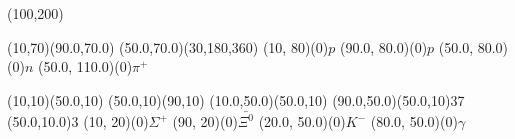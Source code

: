 \documentclass[a4paper]{article}
\begin{document}
        
    \begin{center}
    \begin{axopicture}(100,200) 
    
        \Line[arrow,arrowpos=0.5,arrowlength=6,arrowwidth=3,arrowinset=0.1](10,70)(90.0,70.0)
        (50.0,70.0)(30,180,360)
        \Text(10, 80)(0){$p$}
        \Text(90.0, 80.0)(0){$p$}
        \Text(50.0, 80.0)(0){$n$}
        \Text(50.0, 110.0)(0){$\pi^{+}$}
        
        \Line[arrow,arrowpos=0.5,arrowlength=6,arrowwidth=3,arrowinset=0.1](10,10)(50.0,10)
        \Line[arrow,arrowpos=0.5,arrowlength=6,arrowwidth=3,arrowinset=0.1](50.0,10)(90,10)
        \Line[arrow,arrowpos=0.5,arrowlength=6,arrowwidth=3,arrowinset=0.1,dash](10.0,50.0)(50.0,10)
        \Photon(90.0,50.0)(50.0,10){3}{7}
        \Vertex(50.0,10.0){3}
        \Text(10, 20)(0){$\Sigma^{+}$}
        \Text(90, 20)(0){$\bar{\Xi^0}$}
        \Text(20.0, 50.0)(0){$K^{-}$}
        \Text(80.0, 50.0)(0){$\gamma$}
        
        \end{axopicture}
        \end{center}
        
\end{document}

